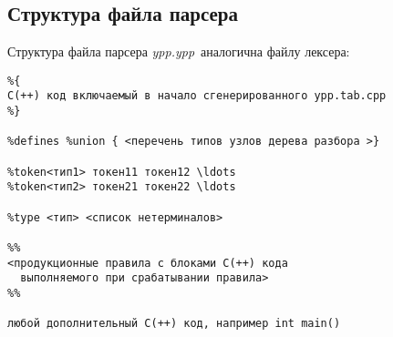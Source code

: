 \documentclass[oneside,10pt]{article}
\newcommand{\file}[1]{\textit{#1}}
\begin{document}
\subsection{Структура файла парсера}

Структура файла парсера \file{ypp.ypp}\ аналогична файлу лексера: 

\begin{verbatim}
%{
С(++) код включаемый в начало сгенерированного ypp.tab.cpp
%}

%defines %union { <перечень типов узлов дерева разбора >}

%token<тип1> токен11 токен12 \ldots
%token<тип2> токен21 токен22 \ldots

%type <тип> <список нетерминалов>

%%
<продукционные правила c блоками С(++) кода
  выполняемого при срабатывании правила>
%%

любой дополнительный С(++) код, например int main()
\end{verbatim}
\end{document}
